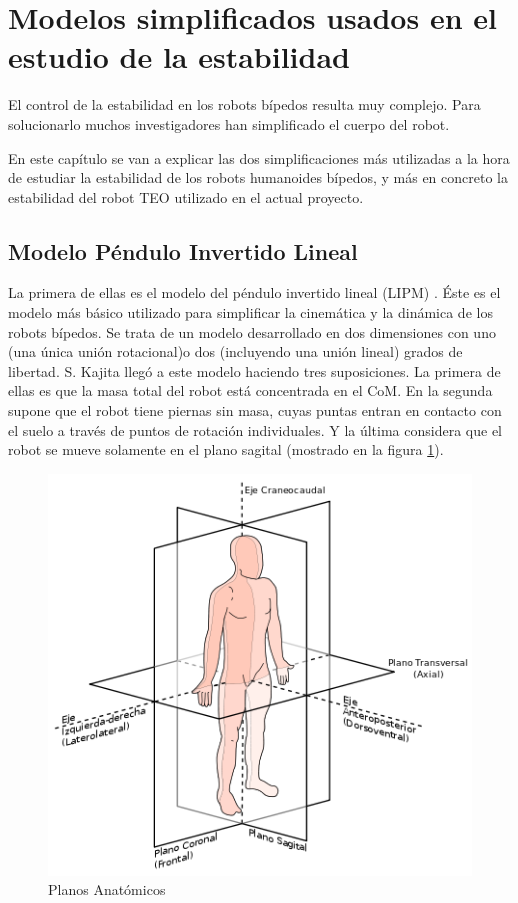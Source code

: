 \section{Modelos simplificados usados en el estudio de la estabilidad}

El control de la estabilidad en los robots bípedos resulta muy complejo. Para solucionarlo muchos investigadores han simplificado el cuerpo del robot. 

En este capítulo se van a explicar las dos simplificaciones más utilizadas a la hora de estudiar la estabilidad de los robots humanoides bípedos, y más en concreto la estabilidad del robot TEO utilizado en el actual proyecto.



\subsection{Modelo Péndulo Invertido Lineal}

La primera de ellas es el modelo del péndulo invertido lineal (LIPM)%
. Éste es el modelo más básico utilizado para simplificar la cinemática y la dinámica de los robots bípedos. Se trata de un modelo desarrollado en dos dimensiones con uno (una única unión rotacional)o dos (incluyendo una unión lineal) grados de libertad. S. Kajita \cite{ref10} llegó a este modelo haciendo tres suposiciones. La primera de ellas es que la masa total del robot está concentrada en el CoM. En la segunda supone que el robot tiene piernas sin masa, cuyas puntas entran en contacto con el suelo a través de puntos de rotación individuales. Y la última considera que el robot se mueve solamente en el plano sagital (mostrado en la figura \ref{figura41}).

\begin{figure}[H]
\centering
\includegraphics[scale=0.6]{imagenes/apartado_4/41_plano_anatomico_sagital3}
\caption{Planos Anatómicos}
\label{figura41}
\end{figure}

